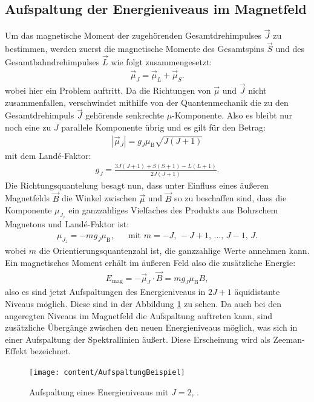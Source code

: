 \documentclass{article}
\begin{document}
	\subsection{Aufspaltung der Energieniveaus im Magnetfeld}
	Um das magnetische Moment der zugehörenden Gesamtdrehimpulses $\vec{J}$ zu bestimmen, werden zuerst die magnetische Momente des Gesamtspins $\vec{S} $ und des Gesamtbahndrehimpulses $\vec{L}$ wie folgt zusammengesetzt:
	\begin{align}
	\vec{\mu}_J=\vec{\mu}_L+\vec{\mu}_S.
	\end{align} 
	wobei hier ein Problem auftritt. Da die Richtungen von $\vec{\mu}$ und $\vec{J}$ nicht zusammenfallen, verschwindet mithilfe von der Quantenmechanik die zu den Gesamtdrehimpuls $\vec{J}$ gehörende senkrechte $\mu$-Komponente. Also es bleibt nur noch eine zu $J$ parallele Komponente übrig und es gilt für den Betrag:
	\begin{align}
	|\vec{\mu}_J|=g_J\mu_\text{B}\sqrt{J(J+1)}
	\end{align}
	mit dem Landé-Faktor:
	\begin{align}
	g_J=\frac{3J(J+1)+S(S+1)-L(L+1)}{2J(J+1)}. \label{eqn:lande}
	\end{align}
	Die Richtungsquantelung besagt nun, dass unter Einfluss eines äußeren Magnetfelds $\vec{B}$ die Winkel zwischen $\vec{\mu}$ und $\vec{B}$ so zu beschaffen sind, dass die Komponente $\mu_{J_z}$ ein ganzzahliges Vielfaches des Produkts aus Bohrschem Magnetons und Landé-Faktor ist:
	\begin{align}
	\mu_{J_z}=-mg_J\mu_\text{B}, &&\text{mit } m=-J,\,-J+1,\,...,\,J-1,\,J.
	\end{align}
	wobei $m$ die Orientierungsquantenzahl ist, die ganzzahlige Werte annehmen kann. Ein magnetisches Moment erhält im äußeren Feld also die zusätzliche Energie: 
	\begin{align}
	E_\text{mag}=-\vec{\mu}_J\cdot\vec{B}=mg_J\mu_\text{B}B,
	\label{eqn:emag}
	\end{align}
	also es sind jetzt Aufspaltungen des Energieniveaus in $2J+1$ äquidistante Niveaus möglich. Diese sind in der Abbildung \ref{fig:aufspaltungbeispiel} zu sehen. Da auch bei den angeregten Niveaus im Magnetfeld die Aufspaltung auftreten kann, sind zusätzliche Übergänge zwischen den neuen Energieniveaus möglich, was sich in einer Aufspaltung der Spektrallinien äußert. Diese Erscheinung wird als Zeeman-Effekt bezeichnet.
	\begin{figure}[h!]
		\centering
		\texttt{[image: content/AufspaltungBeispiel]}
		\caption{Aufspaltung eines Energieniveaus mit $J = 2$, \cite[5]{anleitungV27}.}
		\label{fig:aufspaltungbeispiel}
	\end{figure}
	
\end{document}
